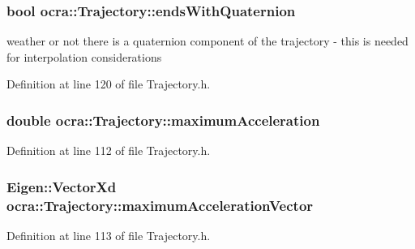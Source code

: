 \subsubsection[{\texorpdfstring{ends\+With\+Quaternion}{endsWithQuaternion}}]{\setlength{\rightskip}{0pt plus 5cm}bool ocra\+::\+Trajectory\+::ends\+With\+Quaternion\hspace{0.3cm}{\ttfamily [protected]}}\hypertarget{classocra_1_1Trajectory_a4f230978860de9473f83df3b8ae31ad9}{}\label{classocra_1_1Trajectory_a4f230978860de9473f83df3b8ae31ad9}
weather or not there is a quaternion component of the trajectory -\/ this is needed for interpolation considerations 

Definition at line 120 of file Trajectory.\+h.

\subsubsection[{\texorpdfstring{maximum\+Acceleration}{maximumAcceleration}}]{\setlength{\rightskip}{0pt plus 5cm}double ocra\+::\+Trajectory\+::maximum\+Acceleration\hspace{0.3cm}{\ttfamily [protected]}}\hypertarget{classocra_1_1Trajectory_a9dbb0a7d6ecaeaf98b915193a8c853d7}{}\label{classocra_1_1Trajectory_a9dbb0a7d6ecaeaf98b915193a8c853d7}


Definition at line 112 of file Trajectory.\+h.

\subsubsection[{\texorpdfstring{maximum\+Acceleration\+Vector}{maximumAccelerationVector}}]{\setlength{\rightskip}{0pt plus 5cm}Eigen\+::\+Vector\+Xd ocra\+::\+Trajectory\+::maximum\+Acceleration\+Vector\hspace{0.3cm}{\ttfamily [protected]}}\hypertarget{classocra_1_1Trajectory_a86d9d30e890716e117ab2d3b4b328f3d}{}\label{classocra_1_1Trajectory_a86d9d30e890716e117ab2d3b4b328f3d}


Definition at line 113 of file Trajectory.\+h.

